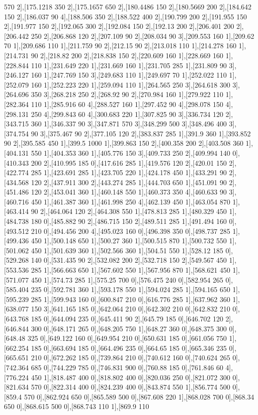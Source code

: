 {570 2],[175.1218 350 2],[175.1657 650 2],[180.4486 150 2],[180.5669 200 2],[184.642 150 2],[186.037 90 4],[188.506 350 2],[188.522 400 2],[190.799 200 2],[191.955 150 2],[191.977 150 2],[192.065 300 2],[192.084 150 2],[192.13 200 2],[206.401 200 2],[206.442 250 2],[206.868 120 2],[207.109 90 2],[208.034 90 3],[209.553 160 1],[209.62 70 1],[209.686 110 1],[211.759 90 2],[212.15 90 2],[213.018 110 1],[214.278 160 1],[214.731 90 2],[218.82 200 2],[218.838 150 2],[220.609 160 1],[228.669 160 1],[228.844 110 1],[231.649 220 1],[231.669 160 1],[231.705 285 1],[231.809 90 3],[246.127 160 1],[247.769 150 3],[249.683 110 1],[249.697 70 1],[252.022 110 1],[252.079 160 1],[252.223 220 1],[259.094 110 1],[264.565 250 3],[264.618 300 3],[264.696 350 3],[268.218 250 2],[268.92 90 2],[270.984 160 1],[279.922 110 1],[282.364 110 1],[285.916 60 4],[288.527 160 1],[297.452 90 4],[298.078 150 4],[298.131 250 4],[299.843 60 4],[300.683 220 1],[307.825 90 3],[336.734 120 2],[343.715 360 1],[346.337 90 3],[347.871 570 3],[348.299 500 3],[348.496 400 3],[374.754 90 3],[375.467 90 2],[377.105 120 2],[383.837 285 1],[391.9 360 1],[393.852 90 2],[395.585 450 1],[399.5 1000 1],[399.863 150 2],[400.358 200 2],[403.508 360 1],[404.131 550 1],[404.353 360 1],[405.776 150 3],[409.733 250 2],[409.994 140 0],[410.343 200 2],[410.995 185 0],[417.616 285 1],[419.576 120 2],[420.01 150 2],[422.774 285 1],[423.691 285 1],[423.705 220 1],[424.178 450 1],[433.291 90 2],[434.568 120 2],[437.911 300 2],[443.274 285 1],[444.703 650 1],[451.091 90 2],[451.486 120 2],[453.041 360 1],[460.148 550 1],[460.373 350 4],[460.633 90 3],[460.716 450 1],[461.387 360 1],[461.998 250 4],[462.139 450 1],[463.054 870 1],[463.414 90 2],[464.064 120 2],[464.308 550 1],[478.813 285 1],[480.329 450 1],[484.738 180 0],[485.882 90 2],[486.715 150 2],[489.511 285 1],[491.494 160 0],[493.512 210 0],[494.456 200 4],[495.023 160 0],[496.398 350 0],[498.737 285 1],[499.436 450 1],[500.148 650 1],[500.27 360 1],[500.515 870 1],[500.732 550 1],[501.062 450 1],[501.639 360 1],[502.566 360 1],[504.51 550 1],[528.12 185 0],[529.268 140 0],[531.435 90 2],[532.082 200 2],[532.718 150 2],[549.567 450 1],[553.536 285 1],[566.663 650 1],[567.602 550 1],[567.956 870 1],[568.621 450 1],[571.077 450 1],[574.73 285 1],[575.25 700 0],[576.475 240 0],[582.954 265 0],[585.404 235 0],[592.781 360 1],[593.178 550 1],[594.024 285 1],[594.165 650 1],[595.239 285 1],[599.943 160 0],[600.847 210 0],[616.776 285 1],[637.962 360 1],[638.077 150 3],[641.165 185 0],[642.064 210 0],[642.302 210 0],[642.832 210 0],[643.768 185 0],[644.094 235 0],[645.411 90 2],[645.79 185 0],[646.702 120 2],[646.844 300 0],[648.171 265 0],[648.205 750 1],[648.27 360 0],[648.375 300 0],[648.48 325 0],[649.122 160 0],[649.954 210 0],[650.631 185 0],[661.056 750 1],[662.254 185 0],[663.694 185 0],[664.496 235 0],[664.65 185 0],[665.346 235 0],[665.651 210 0],[672.262 185 0],[739.864 210 0],[740.612 160 0],[740.624 265 0],[742.364 685 0],[744.229 785 0],[746.831 900 0],[760.88 185 0],[761.846 60 4],[776.224 450 1],[818.487 400 0],[818.802 400 0],[820.036 250 0],[821.072 300 0],[821.634 570 0],[822.314 400 0],[824.239 400 0],[843.874 550 1],[856.774 500 0],[859.4 570 0],[862.924 650 0],[865.589 500 0],[867.608 220 1],[868.028 700 0],[868.34 650 0],[868.615 500 0],[868.743 110 1],[869.9 110 }
